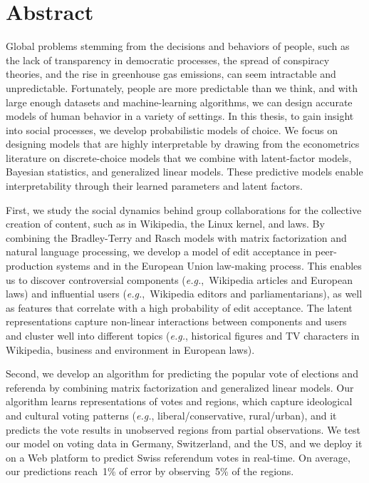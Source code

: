\cleardoublepage
\chapter*{Abstract}

Global problems stemming from the decisions and behaviors of people, such as the lack of transparency in democratic processes, the spread of conspiracy theories, and the rise in greenhouse gas emissions, can seem intractable and unpredictable.
Fortunately, people are more predictable than we think, and with large enough datasets and machine-learning algorithms, we can design accurate models of human behavior in a variety of settings.
In this thesis, to gain insight into social processes, we develop probabilistic models of choice.
We focus on designing models that are highly interpretable by drawing from the econometrics literature on discrete-choice models that we combine with latent-factor models, Bayesian statistics, and generalized linear models.
These predictive models enable interpretability through their learned parameters and latent factors.

First, we study the social dynamics behind group collaborations for the collective creation of content, such as in Wikipedia, the Linux kernel, and laws.
By combining the Bradley-Terry and Rasch models with matrix factorization and natural language processing, we develop a model of edit acceptance in peer-production systems and in the European Union law-making process.
This enables us to discover controversial components (\textit{e.g.},~Wikipedia articles and European laws) and influential users (\textit{e.g.},~Wikipedia editors and parliamentarians), as well as features that correlate with a high probability of edit acceptance.
The latent representations capture non-linear interactions between components and users and cluster well into different topics (\textit{e.g.}, historical figures and TV characters in Wikipedia, business and environment in European laws).

Second, we develop an algorithm for predicting the popular vote of elections and referenda by combining matrix factorization and generalized linear models.
Our algorithm learns representations of votes and regions, which capture ideological and cultural voting patterns (\textit{e.g.}, liberal/conservative, rural/urban), and it predicts the vote results in unobserved regions from partial observations.
We test our model on voting data in Germany, Switzerland, and the US, and we deploy it on a Web platform to predict Swiss referendum votes in real-time.
On average, our predictions reach~1\% of error by observing~5\% of the regions.

